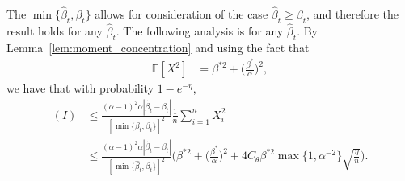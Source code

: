 \documentclass[runningheads]{llncs}
\newcommand{\E}{\mathbb{E}}
\begin{document}
\begin{subappendices}
\begin{align*}
        \end{align*}
        The $\min\{\hat{\beta}_t, \beta_t\}$ allows for consideration of the
        case $\hat{\beta}_t \geq \beta_t$, and therefore the result holds for
        any $\hat{\beta}_t$. The following analysis is for any $\hat{\beta}_t$.
        By Lemma~\ref{lem:moment_concentration} and using the fact that
        \begin{align*}
          \E[X^2]
          &= \beta^{*2} + \Big(\frac{\beta^*}{\alpha}\Big)^2,
        \end{align*}
        we have that with probability $1-e^{-\eta}$,
        \begin{align*}
          (I)
          &
          \leq
            \frac{(\alpha - 1)^2\alpha|\hat{\beta}_t - \beta_t|}
            {[\min\{\hat{\beta}_t, \beta_t\}]^2}
            \frac{1}{n}\sum_{i=1}^n X_i^2
          \\
          &
            \leq
            \frac{(\alpha - 1)^2\alpha|\hat{\beta}_t - \beta_t|}
            {[\min\{\hat{\beta}_t, \beta_t\}]^2}
            \Big(
            \beta^{*2} + \Big(\frac{\beta^*}{\alpha}\Big)^2
            +
            4C_{\theta}\beta^{*2}\max\{1, \alpha^{-2}\} \sqrt{\frac{\eta}{n}}
            \Big).
        \end{align*}


\end{subappendices}
\end{document}
